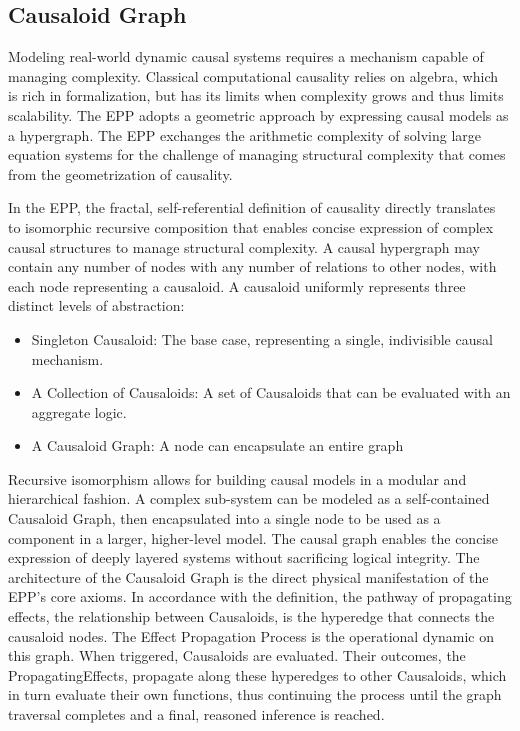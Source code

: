 %
%
\subsection{Causaloid Graph}
\label{sec:epp_causaloid_graph}

Modeling real-world dynamic causal systems requires a mechanism capable of managing complexity.
Classical computational causality relies on algebra, which is rich in formalization,
but has its limits when complexity grows and thus limits scalability. The EPP adopts 
a geometric approach by expressing causal models as a hypergraph. The EPP
exchanges the arithmetic complexity of solving large equation systems for the challenge of managing structural complexity that comes from the geometrization of causality.

In the EPP, the fractal, self-referential definition of causality directly translates 
to isomorphic recursive composition that enables concise expression of complex causal structures to manage structural complexity. A causal hypergraph may contain any number of nodes with any number of relations to other nodes, with each node representing a causaloid. A causaloid uniformly represents three distinct levels of abstraction:

\begin{itemize}
 	\item Singleton Causaloid: The base case, representing a single, indivisible causal mechanism.
 	\item A Collection of Causaloids: A set of Causaloids that can be evaluated with an aggregate logic. 
 	\item A Causaloid Graph: A node can encapsulate an entire graph
\end{itemize}

Recursive isomorphism allows for building causal models in a modular and hierarchical fashion. 
A complex sub-system can be modeled as a self-contained Causaloid Graph, then encapsulated into a single node to be used as a component in a larger, higher-level model. The causal graph enables the concise expression of deeply layered systems without sacrificing logical integrity. The architecture of the Causaloid Graph is the direct physical manifestation of the EPP's core axioms. In accordance with the definition, the pathway of propagating effects, the relationship between Causaloids, is the hyperedge that connects the causaloid nodes. The Effect Propagation Process is the operational dynamic on this graph. When triggered, Causaloids are evaluated. Their outcomes, the PropagatingEffects, propagate along these hyperedges to other Causaloids, which in turn evaluate their own functions, thus continuing the process until the graph traversal completes and a final, reasoned inference is reached.


